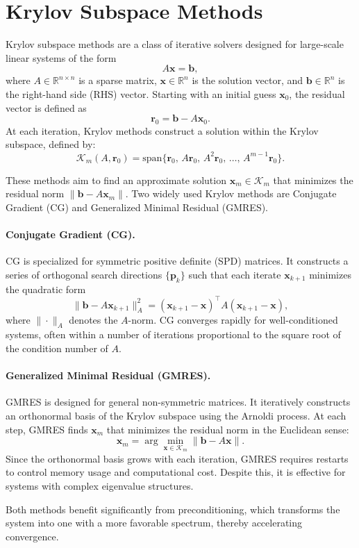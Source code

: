 \section{Krylov Subspace Methods}
\label{sec:krylov}
Krylov subspace methods are a class of iterative solvers designed for large-scale linear systems of the form
\begin{equation}
    A\mathbf{x} = \mathbf{b},
\end{equation}
where \(A \in \mathbb{R}^{n \times n}\) is a sparse matrix, \(\mathbf{x}\in \mathbb{R}^n\) is the solution vector, and \(\mathbf{b}\in \mathbb{R}^n\) is the right-hand side (RHS) vector. Starting with an initial guess \(\mathbf{x}_0\), the residual vector is defined as
\begin{equation}
    \mathbf{r}_0 = \mathbf{b} - A\mathbf{x}_0.
\end{equation}
At each iteration, Krylov methods construct a solution within the Krylov subspace, defined by:
\begin{equation}
    \mathcal{K}_m(A, \mathbf{r}_0) = \text{span}\{\mathbf{r}_0,\, A\mathbf{r}_0,\, A^2\mathbf{r}_0,\, \dots,\, A^{m-1}\mathbf{r}_0\}.
\end{equation}

These methods aim to find an approximate solution \(\mathbf{x}_m \in \mathcal{K}_m\) that minimizes the residual norm \(\|\mathbf{b} - A\mathbf{x}_m\|\). Two widely used Krylov methods are Conjugate Gradient (CG) and Generalized Minimal Residual (GMRES).

\paragraph{Conjugate Gradient (CG).} CG is specialized for symmetric positive definite (SPD) matrices. It constructs a series of orthogonal search directions \(\{\mathbf{p}_k\}\) such that each iterate \(\mathbf{x}_{k+1}\) minimizes the quadratic form
\begin{equation}
    \|\mathbf{b} - A\mathbf{x}_{k+1}\|_A^2 = (\mathbf{x}_{k+1} - \mathbf{x})^\top A (\mathbf{x}_{k+1} - \mathbf{x}),
\end{equation}
where \(\| \cdot \|_A\) denotes the \(A\)-norm. CG converges rapidly for well-conditioned systems, often within a number of iterations proportional to the square root of the condition number of \(A\).

\paragraph{Generalized Minimal Residual (GMRES).} GMRES is designed for general non-symmetric matrices. It iteratively constructs an orthonormal basis of the Krylov subspace using the Arnoldi process. At each step, GMRES finds \(\mathbf{x}_m\) that minimizes the residual norm in the Euclidean sense:
\begin{equation}
    \mathbf{x}_m = \arg\min_{\mathbf{x} \in \mathcal{K}_m} \|\mathbf{b} - A\mathbf{x}\|.
\end{equation}
Since the orthonormal basis grows with each iteration, GMRES requires restarts to control memory usage and computational cost. Despite this, it is effective for systems with complex eigenvalue structures.

Both methods benefit significantly from preconditioning, which transforms the system into one with a more favorable spectrum, thereby accelerating convergence.
